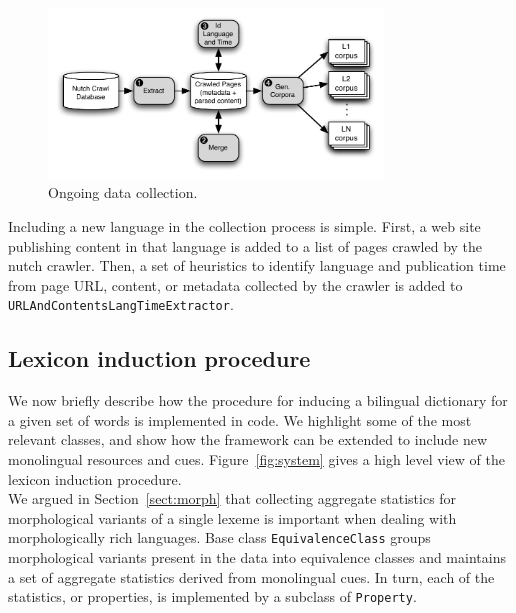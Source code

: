 \documentclass{article}
\newcommand{\secref}[1]{Section~\ref{#1}}
\newcommand{\figref}[1]{Figure~\ref{#1}}
\newcommand{\code}[1]{{\small \tt #1}}
\begin{document}
\begin{figure}[h]
\centerline{\mbox{\includegraphics[width=3.5in]{figures/datacollect}}}
\caption{Ongoing data collection.}
\label{fig:data}
\end{figure}

Including a new language in the collection process is simple.  First, a web site publishing content in that language is added to a list of pages crawled by the nutch crawler.  Then, a set of heuristics to identify language and publication time from page URL, content, or metadata collected by the crawler is added to \code{URLAndContentsLangTimeExtractor}.

\subsection{Lexicon induction procedure}

We now briefly describe how the procedure for inducing a bilingual dictionary for a given set of words is implemented in code.  We highlight some of the most relevant classes, and show how the framework can be extended to include new monolingual resources and cues.  \figref{fig:system} gives a high level view of the lexicon induction procedure.\\


We argued in \secref{sect:morph} that collecting aggregate statistics for morphological variants of a single lexeme is important when dealing with morphologically rich languages.   Base class \code{EquivalenceClass} groups morphological variants present in the data into equivalence classes and maintains a set of aggregate statistics derived from monolingual cues.  In turn, each of the statistics, or properties, is implemented by a subclass of \code{Property}. \\
\end{document}
